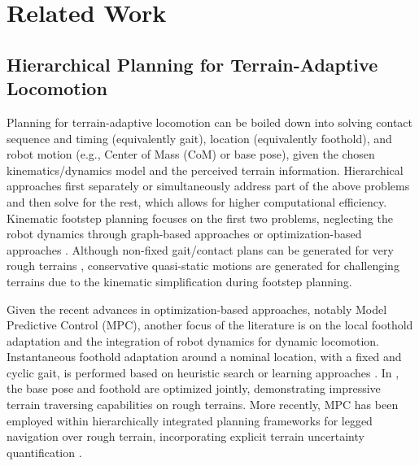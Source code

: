 \section{Related Work}
\subsection{Hierarchical Planning for Terrain-Adaptive Locomotion}
Planning for terrain-adaptive locomotion can be boiled down into solving contact sequence and timing (equivalently gait), location (equivalently foothold), and robot motion (e.g., Center of Mass (CoM) or base pose), given the chosen kinematics/dynamics model and the perceived terrain information. Hierarchical approaches first separately or simultaneously address part of the above problems and then solve for the rest, which allows for higher computational efficiency.  
Kinematic footstep planning focuses on the first two problems, neglecting the robot dynamics through graph-based approaches \citep{kolter2008control,kalakrishnan2010fast,winkler2014path,mastalli2015line,fankhauser2018robust,griffin2019footstep} or optimization-based approaches \citep{deits2014footstep,tonneau2020sl1m,risbourg2022real, ren2025accelerating}.
Although non-fixed gait/contact plans can be generated for very rough terrains \citep{hauser2005non,bretl2006motion,tonneau2018efficient}, conservative quasi-static motions are generated for challenging terrains due to the kinematic simplification during  footstep planning. 

Given the recent advances in optimization-based approaches, notably Model Predictive Control (MPC), another focus of the literature is on the local foothold adaptation and the integration of robot dynamics for dynamic locomotion.
Instantaneous foothold adaptation around a nominal location, with a fixed and cyclic gait, is performed based on heuristic search \citep{jenelten2020perceptive,kim2020vision,agrawal2022vision} or learning approaches \citep{magana2019fast, villarreal2020mpc,yu2021visual,gangapurwala2022rloc, wu2025learn, Kamohara2025RLMPC}. 
In \citep{grandia2021multi,jenelten2022tamols,grandia2023perceptive}, the base pose and foothold are optimized jointly, demonstrating impressive terrain traversing capabilities on rough terrains. More recently, MPC has been employed within hierarchically integrated planning frameworks for legged navigation over rough terrain, incorporating explicit terrain uncertainty quantification \citep{muenprasitivej2024bipedal, shamsah2025terrain, muenprasitivej2026bipedal}.

